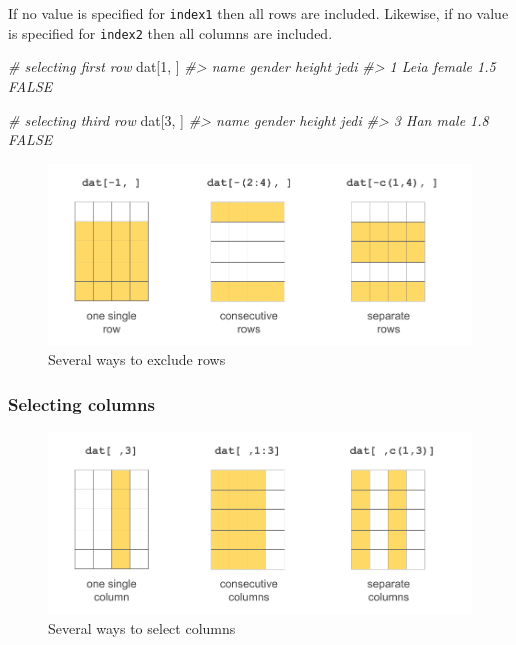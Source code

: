 \documentclass[
]{book}
\newenvironment{Shaded}{\begin{snugshade}}{\end{snugshade}}
\newcommand{\CommentTok}[1]{\textcolor[rgb]{0.56,0.35,0.01}{\textit{#1}}}
\newcommand{\DecValTok}[1]{\textcolor[rgb]{0.00,0.00,0.81}{#1}}
\newcommand{\NormalTok}[1]{#1}
\begin{document}
If no value is specified for \texttt{index1} then all rows are included. Likewise,
if no value is specified for \texttt{index2} then all columns are included.

\begin{Shaded}
\begin{Highlighting}[]
\CommentTok{\# selecting first row}
\NormalTok{dat[}\DecValTok{1}\NormalTok{, ]}
\CommentTok{\#\textgreater{}   name gender height  jedi}
\CommentTok{\#\textgreater{} 1 Leia female    1.5 FALSE}

\CommentTok{\# selecting third row}
\NormalTok{dat[}\DecValTok{3}\NormalTok{, ]}
\CommentTok{\#\textgreater{}   name gender height  jedi}
\CommentTok{\#\textgreater{} 3  Han   male    1.8 FALSE}
\end{Highlighting}
\end{Shaded}

\begin{figure}

{\centering \includegraphics[width=0.8\linewidth]{images/objects/obj-dataframe-rows2} 

}

\caption{Several ways to exclude rows}\label{fig:unnamed-chunk-150}
\end{figure}

\hypertarget{selecting-columns}{%
\subsubsection*{Selecting columns}\label{selecting-columns}}

\begin{figure}

{\centering \includegraphics[width=0.8\linewidth]{images/objects/obj-dataframe-cols1} 

}

\caption{Several ways to select columns}\label{fig:unnamed-chunk-151}
\end{figure}
\end{document}
